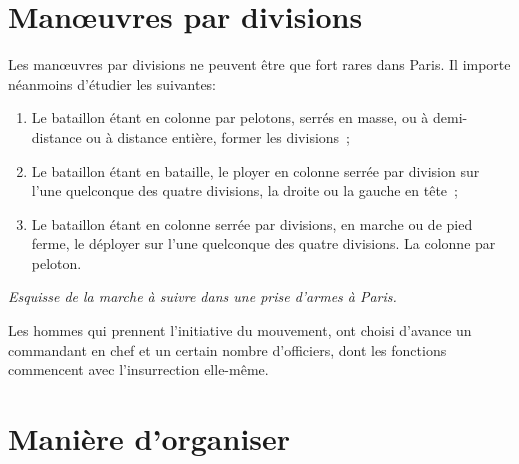 \documentclass[french,twoside]{book} %
\begin{document}
\section[{Manœuvres par divisions}]{Manœuvres par divisions}\renewcommand{\leftmark}{Manœuvres par divisions}

\noindent Les manœuvres par divisions ne peuvent être que fort rares dans Paris. Il importe néanmoins d’étudier les suivantes:\par

\begin{enumerate}[itemsep=0pt,]
\item Le bataillon étant en colonne par pelotons, serrés en masse, ou à demi-distance ou à distance entière, former les divisions ;
\item Le bataillon étant en bataille, le ployer en colonne serrée par division sur l’une quelconque des quatre divisions, la droite ou la gauche en tête ;
\item Le bataillon étant en colonne serrée par divisions, en marche ou de pied ferme, le déployer sur l’une quelconque des quatre divisions. La colonne par peloton.
\end{enumerate}

\noindent \emph{Esquisse de la marche à suivre dans une prise d’armes à Paris.}\par
Les hommes qui prennent l’initiative du mouvement, ont choisi d’avance un commandant en chef et un certain nombre d’officiers, dont les fonctions commencent avec l’insurrection elle-même.
\section[{Manière d’organiser}]{Manière d’organiser}\renewcommand{\leftmark}{Manière d’organiser}
\end{document}
